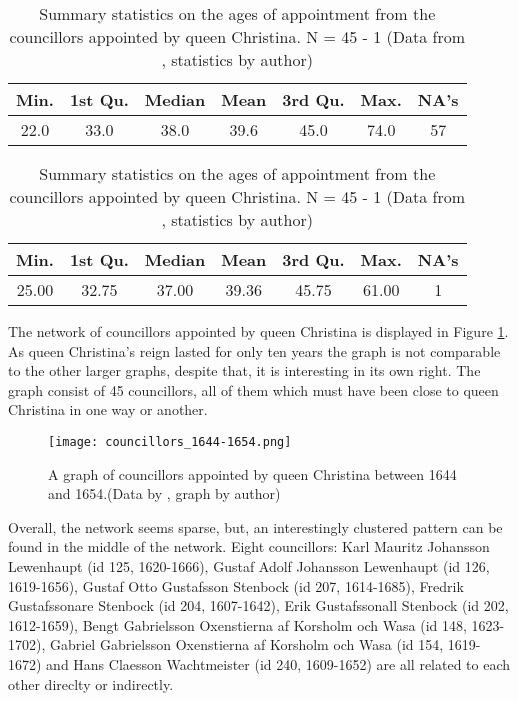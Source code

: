 \begin{table}
	\caption[Summary statistics on the councillors ages of appointment]{Summary statistics on the councillors ages of appointment from the whole dataset (including the reign of Christina). NA meaning a missing value. N = 257 - 57 (Data from \cite{councillorsDS}, statistics by author)}
	\label{councillorsages}
	\centering
	\begin{tabular}{c c c c c c c}
		\hline
		Min. & 1st Qu. & Median & Mean & 3rd Qu. & Max. & NA's \\
		\hline
		22.0 & 33.0 & 38.0 & 39.6 & 45.0 & 74.0 & 57 \\
		\hline
	\end{tabular}
	
	\caption[Summary statistics on the ages of appointment from the councillors appointed by queen Christina]{Summary statistics on the ages of appointment from the councillors appointed by queen Christina. N = 45 - 1 (Data from \cite{councillorsDS}, statistics by author)}
	\label{agesByChristina}
	\centering
	\begin{tabular}{c c c c c c c}
		\hline
		Min. & 1st Qu. & Median & Mean & 3rd Qu. & Max. & NA's \\
		\hline
		25.00 & 32.75 & 37.00 & 39.36 & 45.75 & 61.00 & 1\\
		\hline
	\end{tabular}
\end{table}

The network of councillors appointed by queen Christina is displayed in Figure \ref{queenChristinaCouncillors}. As queen Christina's reign lasted for only ten years the graph is not comparable to the other larger graphs, despite that, it is interesting in its own right. The graph consist of 45 councillors, all of them which must have been close to queen Christina in one way or another.

\begin{figure}	
	\texttt{[image: councillors\_1644-1654.png]}
	\caption[Councillors appointed by queen Christina]{A graph of councillors appointed by queen Christina between 1644 and 1654.(Data by \cite{councillorsDS}, graph by author)}
	\label{queenChristinaCouncillors}
	\centering
\end{figure}

Overall, the network seems sparse, but, an interestingly clustered pattern can be found in the middle of the network. Eight councillors: Karl Mauritz Johansson Lewenhaupt (id 125, 1620-1666), Gustaf Adolf Johansson Lewenhaupt (id 126, 1619-1656), Gustaf Otto Gustafsson Stenbock (id 207, 1614-1685), Fredrik Gustafssonare Stenbock (id 204, 1607-1642), Erik Gustafssonall Stenbock (id 202, 1612-1659), Bengt Gabrielsson Oxenstierna af Korsholm och Wasa (id 148, 1623-1702), Gabriel Gabrielsson Oxenstierna af Korsholm och Wasa (id 154, 1619-1672) and Hans Claesson Wachtmeister (id 240, 1609-1652) are all related to each other direclty or indirectly. 

